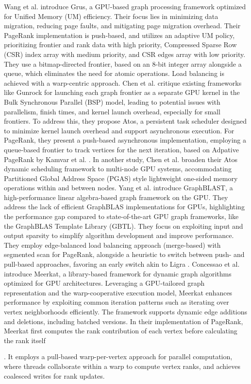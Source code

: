 Wang et al. \cite{wang2021grus} introduce Grus, a GPU-based graph processing framework optimized for Unified Memory (UM) efficiency. Their focus lies in minimizing data migration, reducing page faults, and mitigating page migration overhead. Their PageRank implementation is push-based, and utilizes an adaptive UM policy, prioritizing frontier and rank data with high priority, Compressed Sparse Row (CSR) index array with medium priority, and CSR edges array with low priority. They use a bitmap-directed frontier, based on an 8-bit integer array alongside a queue, which eliminates the need for atomic operations. Load balancing is achieved with a warp-centric approach. Chen et al. \cite{chen2022atos} critique existing frameworks like Gunrock for launching each graph frontier as a separate GPU kernel in the Bulk Synchronous Parallel (BSP) model, leading to potential issues with parallelism, finish times, and kernel launch overhead, especially for small frontiers. To address this, they propose Atos, a persistent task scheduler designed to minimize kernel launch overhead and support asynchronous execution. For PageRank, they present a push-based asynchronous implementation, employing a queue-based frontier to track vertices for the next iteration, based on Adpative PageRank by Kamvar et al. \cite{kamvar2004adaptive}. In another study, Chen et al. \cite{chen2022scalable} broaden their Atos dynamic scheduling framework to multi-node GPU systems, accommodating Partitioned Global Address Space (PGAS) style lightweight one-sided memory operations within and between nodes. Yang et al. \cite{yang2022graphblast} introduce GraphBLAST, a high-performance linear algebra-based graph framework on the GPU. They address the lack of efficient GraphBLAS implementations for GPUs, highlighting the performance gap compared to state-of-the-art GPU graph frameworks, like the GraphBLAS Template Library (GBTL). They focus on exploiting input and output sparsity to simplify algorithm development and improve performance. They employ edge-balanced load balancing approach (merge-based) with segmented scan for PageRank, alongside a heuristic to switch between push- and pull-based approaches, favoring an early switch akin to Ligra \cite{shun2013ligra}. Concessao et al. \cite{concessao2023meerkat} introduce Meerkat, a library-based framework for dynamic graph algorithms optimized for GPU architectures. Leveraging a GPU-tailored graph representation and the warp-cooperative execution model, Meerkat enhances performance by exploiting common iteration patterns such as iterating over vertex neighborhoods efficiently. The framework supports dynamic edge additions and deletions, including batched versions. In their implementation of PageRank, Meerkat first computes the rank contribution of each vertex before calculating the rank itself. It employs a pull-based warp-per-vertex approach for parallel computation, where threads collaborate within a warp to compute vertex ranks, and achieves coalesced writes for rank updates.


